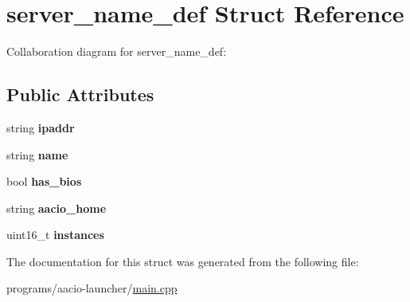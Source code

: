 \hypertarget{structserver__name__def}{}\section{server\+\_\+name\+\_\+def Struct Reference}
\label{structserver__name__def}


Collaboration diagram for server\+\_\+name\+\_\+def\+:
\subsection*{Public Attributes}
\begin{DoxyCompactItemize}
\item 
\mbox{\label{structserver__name__def_a48f0326f794bc8c9f19c03e52cff5f73}} 
string {\bfseries ipaddr}
\item 
\mbox{\label{structserver__name__def_a3721d1e6621a04ffaa5b90d643c1ac29}} 
string {\bfseries name}
\item 
\mbox{\label{structserver__name__def_aa0bb3a6c1ff5c69b30deaff86d1473f6}} 
bool {\bfseries has\+\_\+bios}
\item 
\mbox{\label{structserver__name__def_a2d409631d5bfd1e5ee929024f12bae79}} 
string {\bfseries aacio\+\_\+home}
\item 
\mbox{\label{structserver__name__def_a406bfaeacfd60888ec369eb3a7f44d6f}} 
uint16\+\_\+t {\bfseries instances}
\end{DoxyCompactItemize}


The documentation for this struct was generated from the following file\+:\begin{DoxyCompactItemize}
\item 
programs/aacio-\/launcher/\mbox{\hyperlink{programs_2aacio-launcher_2main_8cpp}{main.\+cpp}}\end{DoxyCompactItemize}
